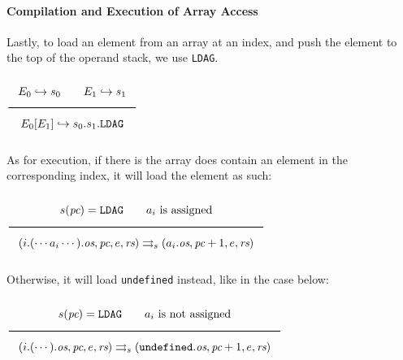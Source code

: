 \paragraph{Compilation and Execution of Array Access}

Lastly, to load an element from an array at an index,
and push the element to the top of the operand stack, we use \texttt{LDAG}.

$\Rule{
E_0 \translateaux s_0 \qquad E_1 \translateaux s_1}
{E_0\lbrack E_1\rbrack \translateaux s_0.s_1.\texttt{LDAG}}
$

As for execution, if there is the array does contain an element in the
corresponding index, it will load the element as such:

$\Rule{s(\textit{pc}) = \texttt{LDAG} \qquad a_i \text{ is assigned}}{
(i.(\cdots a_i\cdots).\textit{os},\textit{pc},e,\textit{rs}) \transition
(a_i.\textit{os},\textit{pc}+1,e,\textit{rs})}
$

Otherwise, it will load \texttt{undefined} instead, like in the case below:

$\Rule{s(\textit{pc}) = \texttt{LDAG} \qquad a_i \text{ is not assigned}}{
(i.(\cdots).\textit{os},\textit{pc},e,\textit{rs}) \transition
(\texttt{undefined}.\textit{os},\textit{pc}+1,e,\textit{rs})}
$
